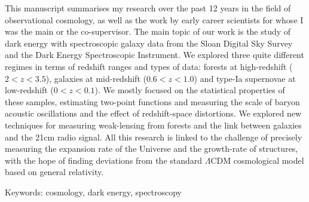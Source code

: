 This manuscript summarises my research over the past 12 years in the field of observational cosmology, 
as well as the work by early career scientists for whose I was the main or the co-supervisor.  
The main topic of our work is the study of dark energy with spectroscopic galaxy data 
from the Sloan Digital Sky Survey and the Dark Energy Spectroscopic Instrument. 
We explored three quite different regimes in terms of redshift ranges and types of data:
\lya forests at high-redshift ($2 < z < 3.5$), galaxies at mid-redshift ($0.6 < z < 1.0$)
and type-Ia supernovae at low-redshift ($0 < z < 0.1$). 
We mostly focused on the statistical properties of these samples, estimating two-point functions 
and measuring the scale of baryon acoustic oscillations and the effect of redshift-space distortions. 
We explored new techniques for measuring weak-lensing from \lya forests and the link between galaxies 
and the 21cm radio signal. 
All this research is linked to the challenge of precisely measuring the expansion rate of the 
Universe and the growth-rate of structures, with the hope of finding deviations from 
the standard $\Lambda$CDM cosmological model based on general relativity. 


\vspace{0.5cm}
Keywords: cosmology, dark energy, spectroscopy
